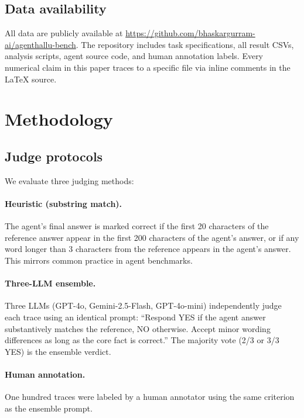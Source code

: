 \documentclass{ieeeaccess}
\begin{document}
\subsection{Data availability}

All data are publicly available at
\url{https://github.com/bhaskargurram-ai/agenthallu-bench}.
The repository includes task specifications, all result CSVs, analysis
scripts, agent source code, and human annotation labels.
Every numerical claim in this paper traces to a specific file via
inline comments in the \LaTeX{} source.


\section{Methodology}
\label{sec:method}

\subsection{Judge protocols}

We evaluate three judging methods:

\paragraph{Heuristic (substring match).}
The agent's final answer is marked correct if the first 20 characters
of the reference answer appear in the first 200 characters of the
agent's answer, or if any word longer than 3 characters from the
reference appears in the agent's answer.
This mirrors common practice in agent benchmarks.

\paragraph{Three-LLM ensemble.}
Three LLMs (GPT-4o, Gemini-2.5-Flash, GPT-4o-mini) independently
judge each trace using an identical prompt: ``Respond YES if the agent
answer substantively matches the reference, NO otherwise.
Accept minor wording differences as long as the core fact is correct.''
The majority vote (2/3 or 3/3 YES) is the ensemble verdict.

\paragraph{Human annotation.}
One hundred traces were labeled by a human annotator using the same
criterion as the ensemble prompt.
\end{document}
